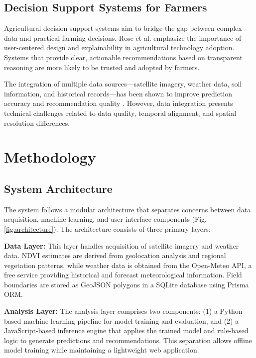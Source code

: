 \documentclass[journal]{IEEEtran}
\begin{document}
\subsection{Decision Support Systems for Farmers}

Agricultural decision support systems aim to bridge the gap between complex data and practical farming decisions. Rose et al. \cite{rose2016decision} emphasize the importance of user-centered design and explainability in agricultural technology adoption. Systems that provide clear, actionable recommendations based on transparent reasoning are more likely to be trusted and adopted by farmers.

The integration of multiple data sources—satellite imagery, weather data, soil information, and historical records—has been shown to improve prediction accuracy and recommendation quality \cite{wolfert2017big}. However, data integration presents technical challenges related to data quality, temporal alignment, and spatial resolution differences.

\section{Methodology}

\subsection{System Architecture}

The system follows a modular architecture that separates concerns between data acquisition, machine learning, and user interface components (Fig. \ref{fig:architecture}). The architecture consists of three primary layers:

\textbf{Data Layer:} This layer handles acquisition of satellite imagery and weather data. NDVI estimates are derived from geolocation analysis and regional vegetation patterns, while weather data is obtained from the Open-Meteo API, a free service providing historical and forecast meteorological information. Field boundaries are stored as GeoJSON polygons in a SQLite database using Prisma ORM.

\textbf{Analysis Layer:} The analysis layer comprises two components: (1) a Python-based machine learning pipeline for model training and evaluation, and (2) a JavaScript-based inference engine that applies the trained model and rule-based logic to generate predictions and recommendations. This separation allows offline model training while maintaining a lightweight web application.
\end{document}
